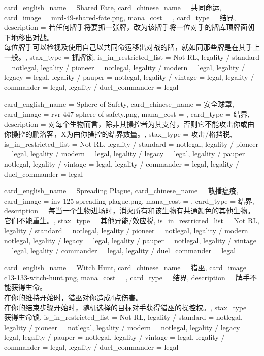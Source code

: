 \documentclass[lang = cn, color = black, 10pt]{AllThatStax}
\begin{document}
\card
{
	card_english_name = {Shared Fate},
	card_chinese_name = {共同命运},
	card_image = mrd-49-shared-fate.png,
	mana_cost = ,
	card_type = 结界,
	description = {若任何牌手将要抓一张牌，改为该牌手将一位对手的牌库顶牌面朝下地移出对战。\\
每位牌手可以检视及使用自己以共同命运移出对战的牌，就如同那些牌是在其手上一般。},
	stax_type = 抓牌锁,
	is_in_restricted_list = Not RL,
	legality / standard = notlegal,
	legality / pioneer = notlegal,
	legality / modern = legal,
	legality / legacy = legal,
	legality / pauper = notlegal,
	legality / vintage = legal,
	legality / commander = legal,
	legality / duel_commander = legal
}

\card
{
	card_english_name = {Sphere of Safety},
	card_chinese_name = {安全球罩},
	card_image = rvr-447-sphere-of-safety.png,
	mana_cost = ,
	card_type = 结界,
	description = {对每个生物而言，除非其操控者为其支付，否则它不能攻击你或由你操控的鹏洛客，X为由你操控的结界数量。},
	stax_type = 攻击/格挡税,
	is_in_restricted_list = Not RL,
	legality / standard = notlegal,
	legality / pioneer = legal,
	legality / modern = legal,
	legality / legacy = legal,
	legality / pauper = notlegal,
	legality / vintage = legal,
	legality / commander = legal,
	legality / duel_commander = legal
}

\card
{
	card_english_name = {Spreading Plague},
	card_chinese_name = {散播瘟疫},
	card_image = inv-125-spreading-plague.png,
	mana_cost = ,
	card_type = 结界,
	description = {每当一个生物进场时，消灭所有和该生物有共通颜色的其他生物。它们不能重生。},
	stax_type = 其他异能/效应税,
	is_in_restricted_list = Not RL,
	legality / standard = notlegal,
	legality / pioneer = notlegal,
	legality / modern = notlegal,
	legality / legacy = legal,
	legality / pauper = notlegal,
	legality / vintage = legal,
	legality / commander = legal,
	legality / duel_commander = legal
}

\card
{
	card_english_name = {Witch Hunt},
	card_chinese_name = {猎巫},
	card_image = c13-133-witch-hunt.png,
	mana_cost = ,
	card_type = 结界,
	description = {牌手不能获得生命。\\
在你的维持开始时，猎巫对你造成4点伤害。\\
在你的结束步骤开始时，随机选择的目标对手获得猎巫的操控权。},
	stax_type = 获得生命锁,
	is_in_restricted_list = Not RL,
	legality / standard = notlegal,
	legality / pioneer = notlegal,
	legality / modern = notlegal,
	legality / legacy = legal,
	legality / pauper = notlegal,
	legality / vintage = legal,
	legality / commander = legal,
	legality / duel_commander = legal
}
\end{document}
